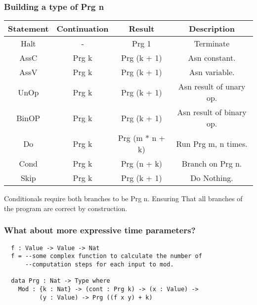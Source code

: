 \documentclass{beamer}
\begin{document}
\begin{frame}[fragile]
  \frametitle{Building a type of Prg n}
  \begin{table}[h!]
  \begin{tabular}{c|c|c|c}
  Statement & Continuation & Result & Description \\
  \hline 
  Halt & - & Prg 1 & Terminate \\
  AssC & Prg k & Prg (k + 1) & Asn constant. \\
  AssV & Prg k & Prg (k + 1) & Asn variable. \\
  UnOp & Prg k & Prg (k + 1) & Asn result of unary op. \\
  BinOP & Prg k & Prg (k + 1) & Asn result of binary op. \\
  Do & Prg k & Prg (m * n + k) & Run Prg m, n times. \\
  Cond & Prg k & Prg (n + k) & Branch on Prg n. \\
  Skip & Prg k & Prg (k + 1) & Do Nothing.
  \end{tabular} 
  \end{table}
  Conditionals require both branches to be Prg n. Ensuring
  That all branches of the program are correct by construction.
\end{frame}

\begin{frame}[fragile]
  \frametitle{What about more expressive time parameters?}
  \begin{verbatim}
  f : Value -> Value -> Nat
  f = --some complex function to calculate the number of
      --computation steps for each input to mod.
  
  data Prg : Nat -> Type where
    Mod : {k : Nat} -> (cont : Prg k) -> (x : Value) ->
          (y : Value) -> Prg ((f x y) + k)
  \end{verbatim}
\end{frame}
\end{document}
